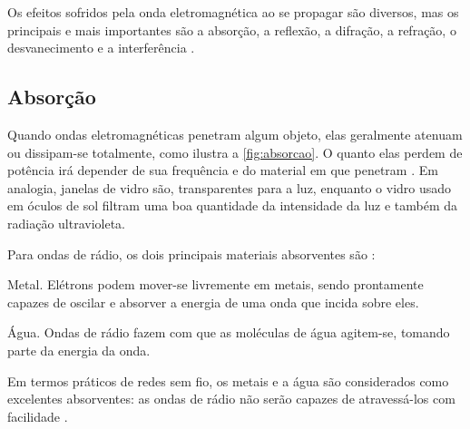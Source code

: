 Os efeitos sofridos pela onda eletromagnética ao se propagar são diversos, mas os principais e mais importantes são a absorção, a reflexão, a difração, a refração, o desvanecimento e a interferência \cite{flickenger2008,haykin2008,rappaport2009}.

\subsection{Absorção}
\label{sub:absorcao}

Quando ondas eletromagnéticas penetram algum objeto, elas geralmente atenuam ou dissipam-se totalmente, como ilustra a \autoref{fig:absorcao}. O quanto elas perdem de potência irá depender de sua frequência e do material em que penetram \cite{flickenger2008}. Em analogia, janelas de vidro são, transparentes para a luz, enquanto o vidro usado em óculos de sol filtram uma boa quantidade da intensidade da luz e também da radiação ultravioleta.

\begin{figure}[H]
	\centering
\end{figure}

Para ondas de rádio, os dois principais materiais absorventes são \cite{flickenger2008}:

\begin{compactitem}
	\item Metal. Elétrons podem mover-se livremente em metais, sendo prontamente capazes de oscilar e absorver a energia de uma onda que incida sobre eles.
	\item Água. Ondas de rádio fazem com que as moléculas de água agitem-se, tomando parte da energia da onda.
\end{compactitem}

Em termos práticos de redes sem fio, os metais e a água são considerados como excelentes absorventes: as ondas de rádio não serão capazes de atravessá-los com facilidade \cite{flickenger2008}.

